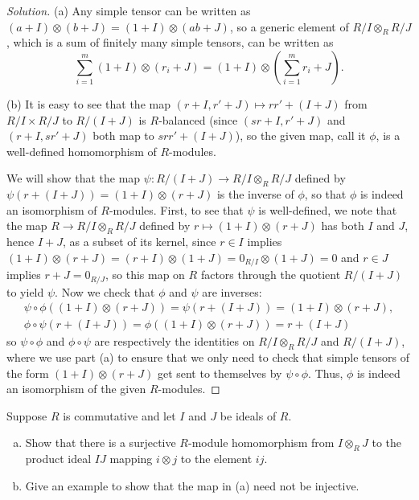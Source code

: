 \documentclass[10pt]{article}
\providecommand{\ii}{\item}
\newenvironment{soln}{\begin{proof}[Solution]}{\end{proof}}
\begin{document}
\begin{soln}
    (a) Any simple tensor can be written as
    $(a + I)\otimes(b + J) = (1 + I)\otimes(ab + J)$,
    so a generic element of $R/I\otimes_R R/J$,
    which is a sum of finitely many simple tensors, can be written as
    \begin{equation*}
	\sum_{i=1}^m (1 + I)\otimes(r_i + J)
	= (1 + I)\otimes\left(\sum_{i=1}^m r_i + J\right).
    \end{equation*}

    (b) It is easy to see that the map
    $(r+I,r'+J)\mapsto rr'+(I+J)$ from $R/I\times R/J$
    to $R/(I+J)$ is $R$-balanced (since $(sr+I,r'+J)$ and
    $(r+I,sr'+J)$ both map to $srr' + (I+J)$), so the given map,
    call it $\phi$, is a well-defined homomorphism of $R$-modules.

    We will show that the map $\psi\colon R/(I+J)\to R/I\otimes_RR/J$
    defined by $\psi(r+(I+J)) = (1+I)\otimes(r+J)$
    is the inverse of $\phi$, so that $\phi$ is indeed
    an isomorphism of $R$-modules. First, to see that $\psi$ is
    well-defined, we note that the map
    $R\to R/I\otimes_RR/J$ defined by $r\mapsto(1+I)\otimes(r+J)$
    has both $I$ and $J$, hence $I+J$, as a subset of its kernel, since
    $r\in I$ implies $(1+I)\otimes(r+J) = (r+I)\otimes(1+J)
    = 0_{R/I}\otimes(1+J) = 0$ and $r\in J$ implies $r+J = 0_{R/J}$,
    so this map on $R$ factors through the quotient $R/(I+J)$
    to yield $\psi$. Now we check that $\phi$ and $\psi$ are inverses:
    \begin{gather*}
        \psi\circ\phi((1+I)\otimes(r+J))
	= \psi(r + (I+J)) = (1 + I)\otimes(r+J),\\
	\phi\circ\psi(r+(I+J)) = \phi((1 + I)\otimes(r+J))
	= r + (I+J)
    \end{gather*}
    so $\psi\circ\phi$ and $\phi\circ\psi$ are respectively the
    identities on $R/I\otimes_RR/J$ and $R/(I+J)$, where we use part (a)
    to ensure that we only need to check that simple tensors of the form
    $(1+I)\otimes(r+J)$ get sent to themselves by $\psi\circ\phi$.
    Thus, $\phi$ is indeed an isomorphism of the given $R$-modules.
\end{soln}

\begin{problem}
    [\S10.4\#21]
    Suppose  $R$ is commutative and let $I$ and $J$ be ideals of $R$.
    \begin{enumerate}[(a)]
        \ii Show that there is a surjective $R$-module homomorphism
	from $I\otimes_R J$ to the product ideal $IJ$
	mapping $i\otimes j$ to the element $ij$.
	\ii Give an example to show that the map in (a)
	need not be injective.
    \end{enumerate}
\end{problem}
\end{document}
